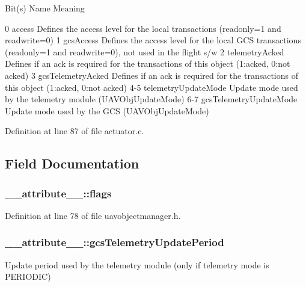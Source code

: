 Bit(s) Name Meaning 

 0 access Defines the access level for the local transactions (readonly=1 and readwrite=0) 1 gcs\-Access Defines the access level for the local G\-C\-S transactions (readonly=1 and readwrite=0), not used in the flight s/w 2 telemetry\-Acked Defines if an ack is required for the transactions of this object (1\-:acked, 0\-:not acked) 3 gcs\-Telemetry\-Acked Defines if an ack is required for the transactions of this object (1\-:acked, 0\-:not acked) 4-\/5 telemetry\-Update\-Mode Update mode used by the telemetry module (U\-A\-V\-Obj\-Update\-Mode) 6-\/7 gcs\-Telemetry\-Update\-Mode Update mode used by the G\-C\-S (U\-A\-V\-Obj\-Update\-Mode) 

Definition at line 87 of file actuator.\-c.



\subsection{Field Documentation}
\hypertarget{struct____attribute_____a2c5106312c60da8340d95ea8f201e8f2}{
\subsubsection[{flags}]{ \-\_\-\-\_\-attribute\-\_\-\-\_\-\-::flags}}\label{struct____attribute_____a2c5106312c60da8340d95ea8f201e8f2}


Definition at line 78 of file uavobjectmanager.\-h.

\hypertarget{struct____attribute_____a6725d1b44961129705dbb1f209ba7b8d}{
\subsubsection[{gcs\-Telemetry\-Update\-Period}]{ \-\_\-\-\_\-attribute\-\_\-\-\_\-\-::gcs\-Telemetry\-Update\-Period}}\label{struct____attribute_____a6725d1b44961129705dbb1f209ba7b8d}
Update period used by the telemetry module (only if telemetry mode is P\-E\-R\-I\-O\-D\-I\-C) 

